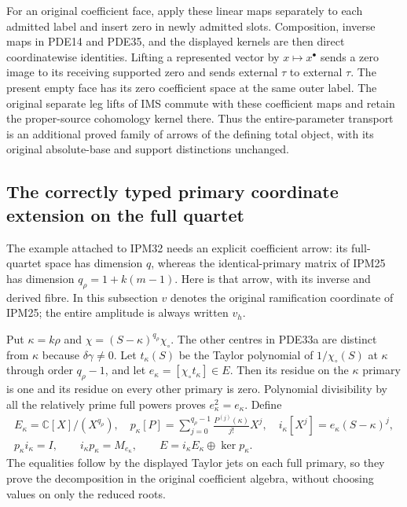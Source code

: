 For an original coefficient face, apply these linear maps separately
to each admitted label and insert zero in newly admitted slots.
Composition, inverse maps in PDE14 and PDE35, and the displayed kernels
are then direct coordinatewise identities. Lifting a represented
vector by $x\mapsto x^\bullet$ sends a zero image to its receiving
supported zero and sends external $\tau$ to external $\tau$.
The present empty face has its zero coefficient space at the same
outer label. The original separate leg lifts of IMS commute with
these coefficient maps and retain the proper-source cohomology
kernel there. Thus the entire-parameter transport is an additional
proved family of arrows of the defining total object, with its
original absolute-base and support distinctions unchanged.

\subsection{The correctly typed primary coordinate extension on the full quartet}

The example attached to IPM32 needs an explicit coefficient arrow:
its full-quartet space has dimension $q$, whereas the identical-primary
matrix of IPM25 has dimension $q_\rho=1+k(m-1)$. Here is that arrow,
with its inverse and derived fibre. In this subsection $v$ denotes
the original ramification coordinate of IPM25; the entire amplitude
is always written $v_h$.

Put $\kappa=k\rho$ and $\chi=(S-\kappa)^{q_\rho}\chi_\circ$.
The other centres in PDE33a are distinct from $\kappa$ because
$\delta\gamma\ne0$. Let $t_\kappa(S)$ be the Taylor polynomial of
$1/\chi_\circ(S)$ at $\kappa$ through order $q_\rho-1$, and let
$e_\kappa=[\chi_\circ t_\kappa]\in E$. Then its residue on the
$\kappa$ primary is one and its residue on every other primary is
zero. Polynomial divisibility by all the relatively prime full powers
proves $e_\kappa^2=e_\kappa$. Define
\[
 \begin{gathered}
 E_\kappa=\mathbb{C}[X]/(X^{q_\rho}),\quad
 p_\kappa[P]=\sum_{j=0}^{q_\rho-1}\frac{P^{(j)}(\kappa)}{j!}X^j,
 \quad i_\kappa[X^j]=e_\kappa(S-\kappa)^j,\\
 p_\kappa i_\kappa=I,\qquad
 i_\kappa p_\kappa=M_{e_\kappa},\qquad
 E=i_\kappa E_\kappa\oplus\ker p_\kappa.
 \end{gathered}
 \tag{PDE37}
\]
The equalities follow by the displayed Taylor jets on each full
primary, so they prove the decomposition in the original coefficient
algebra, without choosing values on only the reduced roots.

